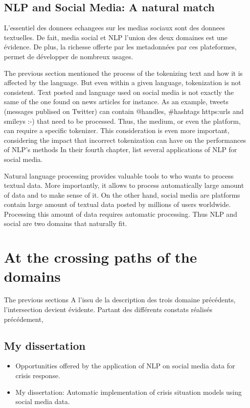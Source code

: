 \subsection{NLP and Social Media: A natural match}
L'essentiel des donnees echangees sur les medias sociaux sont des donnees textuelles.
De fait, media social et NLP l'union des deux domaines est une évidence.
De plus, la richesse offerte par les metadonnées par ces plateformes, permet de développer de nombreux usages.

The previous section mentioned the process of the tokenizing text and how it is affected by the language.
But even within a given language, tokenization is not consistent.
Text posted and language used on social media is not exactly the same of the one found on news articles for instance.
As an example, tweets (messages publised on Twitter) can contain @handles, \#hashtags https:\/\/urls and smileys :-) that need to be processed.
Thus, the medium, or even the platform, can require a specific tokenizer.
This consideration is even more important, considering the impact that incorrect tokenization can have on the performances of NLP's methods
In their fourth chapter, \cite{farzindarNaturalLanguageProcessing2017} list several applications of NLP for social media.

Natural language processing provides valuable tools to who wants to process textual data.
More importantly, it allows to process automatically large amount of data and to make sense of it.
On the other hand, social media are platforms contain large amount of textual data posted by millions of users worldwide.
Processing this amount of data requires automatic processing.
Thus NLP and social are two domains that naturally fit.

\section{At the crossing paths of the domains}
The previous sections
A l'issu de la description des trois domaine précédents, l'intersection devient évidente.
Partant des différents constats réalisés précédement,

\subsection{My dissertation}
\begin{itemize}
    \item Opportunities offered by the application of NLP on social media data for crisis response.
    \item My dissertation: Automatic implementation of crisis situation models using social media data.
\end{itemize}

